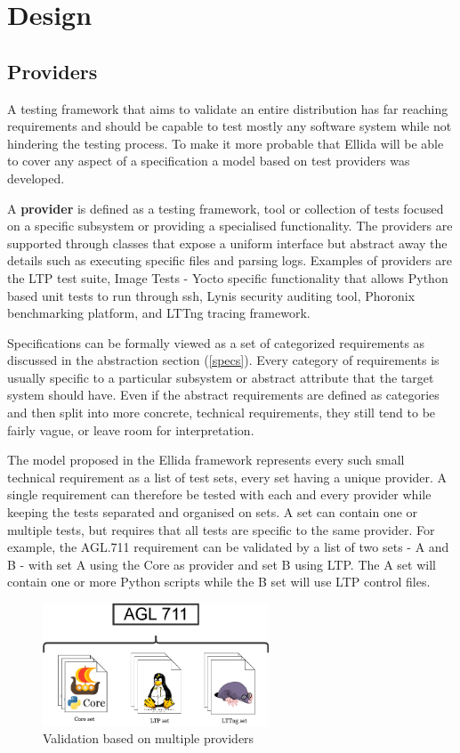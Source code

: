 \chapter{Design}

\section{Providers}
A testing framework that aims to validate an entire distribution has far reaching requirements and should be capable to test mostly any software system while not hindering the testing process. To make it more probable that Ellida will be able to cover any aspect of a specification a model based on test providers was developed.

A \textbf{provider} is defined as a testing framework, tool or collection of tests focused on a specific subsystem or providing a specialised functionality. The providers are supported through classes that expose a uniform interface but abstract away the details such as executing specific files and parsing logs. Examples of providers are the LTP test suite, Image Tests - Yocto specific functionality that allows Python based unit tests to run through ssh, Lynis security auditing tool, Phoronix benchmarking platform, and LTTng tracing framework.

Specifications can be formally viewed as a set of categorized requirements as discussed in the abstraction section (\ref{specs}). Every category of requirements is usually specific to a particular subsystem or abstract attribute that the target system should have. Even if the abstract requirements are defined as categories and then split into more concrete, technical requirements, they still tend to be fairly vague, or leave room for interpretation.

The model proposed in the Ellida framework represents every such small technical requirement as a list of test sets, every set having a unique provider. A single requirement can therefore be tested with each and every provider while keeping the tests separated and organised on sets. A set can contain one or multiple tests, but requires that all tests are specific to the same provider. For example, the AGL.711 requirement can be validated by a list of two sets - A and B - with set A using the Core as provider and set B using LTP. The A set will contain one or more Python scripts while the B set will use LTP control files.

\begin{figure}[h!]
  \centering
	\includegraphics[width=0.6\textwidth]{images/providers.png}
    \caption{Validation based on multiple providers}
\end{figure}

